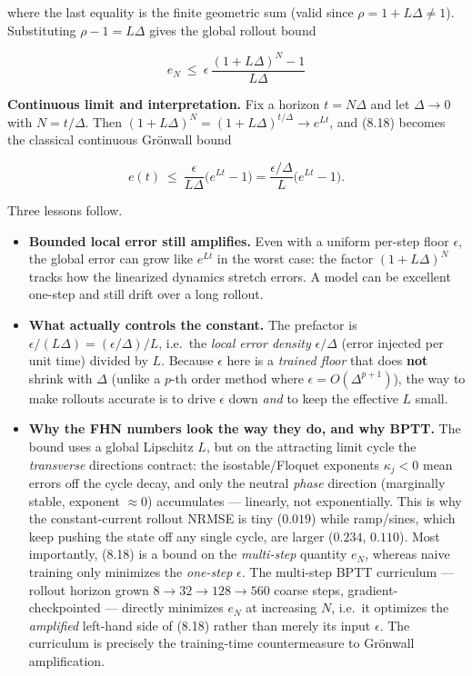\documentclass[
  11pt,
]{article}
\providecommand{\lt}{<}
\begin{document}
where the last equality is the finite geometric sum (valid since
\(\rho=1+L\Delta\neq 1\)). Substituting \(\rho-1=L\Delta\) gives the
global rollout bound

\[
\boxed{\;e_{N}\ \le\ \epsilon\,\frac{(1+L\Delta)^{N}-1}{L\Delta}\;}
\tag{8.18}
\]

\textbf{Continuous limit and interpretation.} Fix a horizon
\(t=N\Delta\) and let \(\Delta\to0\) with \(N=t/\Delta\). Then
\((1+L\Delta)^{N}=(1+L\Delta)^{t/\Delta}\to e^{Lt}\), and (8.18) becomes
the classical continuous Grönwall bound

\[
e(t)\ \le\ \frac{\epsilon}{L\Delta}\big(e^{Lt}-1\big)
=\frac{\epsilon/\Delta}{L}\big(e^{Lt}-1\big).
\tag{8.19}
\]

Three lessons follow.

\begin{itemize}
\item
  \textbf{Bounded local error still amplifies.} Even with a uniform
  per-step floor \(\epsilon\), the global error can grow like \(e^{Lt}\)
  in the worst case: the factor \((1+L\Delta)^{N}\) tracks how the
  linearized dynamics stretch errors. A model can be excellent one-step
  and still drift over a long rollout.
\item
  \textbf{What actually controls the constant.} The prefactor is
  \(\epsilon/(L\Delta)=(\epsilon/\Delta)/L\), i.e.~the \emph{local error
  density} \(\epsilon/\Delta\) (error injected per unit time) divided by
  \(L\). Because \(\epsilon\) here is a \emph{trained floor} that does
  \textbf{not} shrink with \(\Delta\) (unlike a \(p\)-th order method
  where \(\epsilon=O(\Delta^{p+1})\)), the way to make rollouts accurate
  is to drive \(\epsilon\) down \emph{and} to keep the effective \(L\)
  small.
\item
  \textbf{Why the FHN numbers look the way they do, and why BPTT.} The
  bound uses a global Lipschitz \(L\), but on the attracting limit cycle
  the \emph{transverse} directions contract: the isostable/Floquet
  exponents \(\kappa_{j}\lt 0\) mean errors off the cycle decay, and
  only the neutral \emph{phase} direction (marginally stable, exponent
  \(\approx 0\)) accumulates --- linearly, not exponentially. This is
  why the constant-current rollout NRMSE is tiny (\(0.019\)) while
  ramp/sines, which keep pushing the state off any single cycle, are
  larger (\(0.234\), \(0.110\)). Most importantly, (8.18) is a bound on
  the \emph{multi-step} quantity \(e_{N}\), whereas naive training only
  minimizes the \emph{one-step} \(\epsilon\). The multi-step BPTT
  curriculum --- rollout horizon grown \(8\to32\to128\to560\) coarse
  steps, gradient-checkpointed --- directly minimizes \(e_{N}\) at
  increasing \(N\), i.e.~it optimizes the \emph{amplified} left-hand
  side of (8.18) rather than merely its input \(\epsilon\). The
  curriculum is precisely the training-time countermeasure to Grönwall
  amplification.
\end{itemize}
\end{document}

